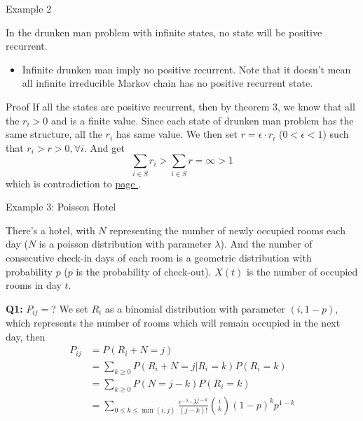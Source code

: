 \documentclass[mathserif]{beamer}
\begin{document}
\begin{frame}{Example 2}
	\begin{example}
	In the drunken man problem with infinite states, no state will be positive recurrent.
	\end{example}
	\begin{itemize}
	\item Infinite drunken man imply no positive recurrent.
		Note that it doesn't mean all infinite irreducible Markov chain has no positive recurrent state.
	\end{itemize}
\end{frame}

\begin{frame}{Proof}
	If all the states are positive recurrent, then by theorem 3, 
	we know that all the $r_i > 0$ and is a finite value.
	Since each state of drunken man problem has the same structure, all the $r_i$ has same value.
	We then set $r = \epsilon\cdot r_i$ ($0 < \epsilon < 1$) such that 
	$r_i > r > 0, \forall i$.
	And get
	\[
	\sum_{i\in S} r_i > \sum_{i\in S} r = \infty > 1
	\]
	which is contradiction to \hyperlink{proportion_sum}{page \pageref{proportion_sum}}.
\end{frame}

\begin{frame}{Example 3: Poisson Hotel}
	\begin{example}
	There's a hotel, with $N$ representing the number of newly occupied rooms each day ($N$ is a poisson distribution with parameter $\lambda$).
	And the number of consecutive check-in days of each room is a geometric distribution with probability $p$ ($p$ is the probability of check-out).
	$X(t)$ is the number of occupied rooms in day $t$.
	\end{example}
\end{frame}

\begin{frame}{\textbf{Q1:} $P_{ij} = $?}
	We set $R_i$ as a binomial distribution with parameter $(i, 1-p)$, which represents the number of rooms which will remain occupied in the next day, then
	\begin{align*}
	P_{ij} & = P(R_i + N = j) \\
	& = \sum_{k\geq 0} P(R_i + N = j | R_i = k)P(R_i = k) \\
	& = \sum_{k\geq 0} P(N = j-k)P(R_i = k) \\
	& = \sum_{0 \leq k \leq \min(i,j)} \frac{e^{-\lambda}\cdot \lambda^{j-k}}{(j-k)!} \binom{i}{k} (1-p)^k p^{1-k}
	\end{align*}
\end{frame}
\end{document}
